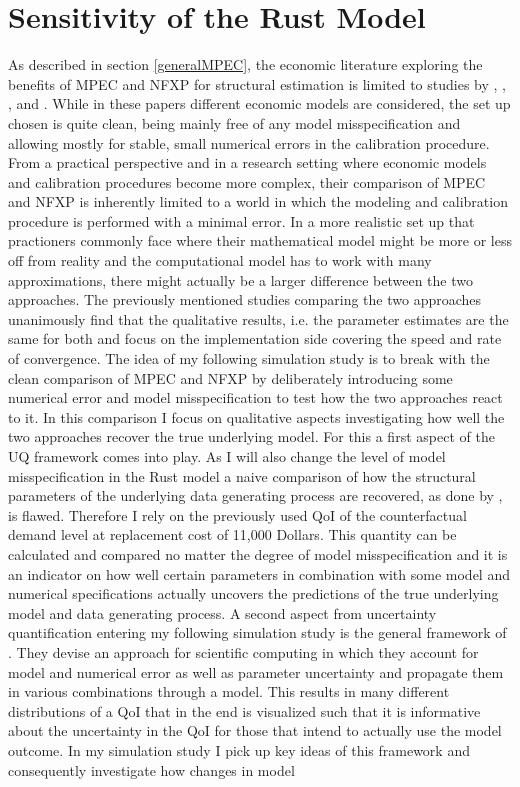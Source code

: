 \section{Sensitivity of the Rust Model} \label{sensitivity}
\thispagestyle{plain} %

As described in section \ref{generalMPEC}, the economic literature exploring the benefits of MPEC and NFXP for structural estimation is limited to studies by \cite{Su.Judd.2012}, \cite{Dube.Fox.Su.2012}, \cite{Jorgensen.2013}, \cite{Iskhakov.2016} and \cite{Dong.Hsieh.Zhang.2017}. While in these papers different economic models are considered, the set up chosen is quite clean, being mainly free of any model misspecification and allowing mostly for stable, small numerical errors in the calibration procedure. From a practical perspective and in a research setting where economic models and calibration procedures become more complex, their comparison of MPEC and NFXP is inherently limited to a world in which the modeling and calibration procedure is performed with a minimal error. In a more realistic set up that practioners commonly face where their mathematical model might be more or less off from reality and the computational model has to work with many approximations, there might actually be a larger difference between the two approaches. The previously mentioned studies comparing the two approaches unanimously find that the qualitative results, i.e. the parameter estimates are the same for both and focus on the implementation side covering the speed and rate of convergence. The idea of my following simulation study is to break with the clean comparison of MPEC and NFXP by deliberately introducing some numerical error and model misspecification to test how the two approaches react to it. In this comparison I focus on qualitative aspects investigating how well the two approaches recover the true underlying model. For this a first aspect of the UQ framework comes into play. As I will also change the level of model misspecification in the Rust model a naive comparison of how the structural parameters of the underlying data generating process are recovered, as done by \cite{Su.Judd.2012}, is flawed. Therefore I rely on the previously used QoI of the counterfactual demand level at replacement cost of 11,000 Dollars. This quantity can be calculated and compared no matter the degree of model misspecification and it is an indicator on how well certain parameters in combination with some model and numerical specifications actually uncovers the predictions of the true underlying model and data generating process. A second aspect from uncertainty quantification entering my following simulation study is the general framework of \cite{Oberkampf.2010}. They devise an approach for scientific computing in which they account for model and numerical error as well as parameter uncertainty and propagate them in various combinations through a model. This results in many different distributions of a QoI that in the end is visualized such that it is informative about the uncertainty in the QoI for those that intend to actually use the model outcome. In my simulation study I pick up key ideas of this framework and consequently investigate how changes in model 